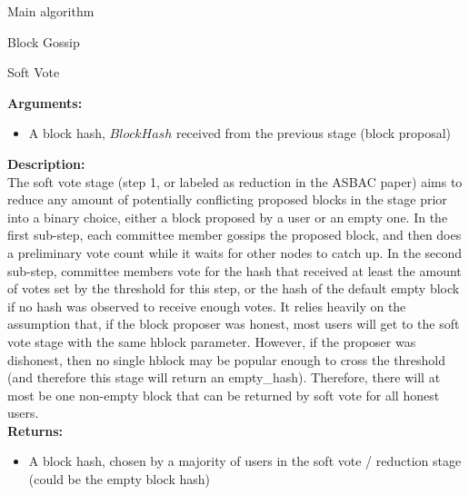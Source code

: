 \documentclass[10pt,a4paper]{article}
\begin{document}
\begin{section}{Main algorithm}
\begin{subsection}{Block Gossip}
\begin{algorithm}[H]
    \caption{\underline{Soft Vote}}
\end{algorithm}


\end{subsection}
\begin{subsection}{Soft Vote}

\noindent \textbf{Arguments:}
\begin{itemize}
    \item A block hash, $BlockHash$ received from the previous stage (block proposal)
  \end{itemize}

\noindent \textbf{Description:}\\
The soft vote stage (step 1, or labeled as reduction in the ASBAC paper) aims to reduce 
any amount of potentially conflicting proposed blocks in the stage prior into a binary 
choice, either a block proposed by a user or an empty one.
In the first sub-step, each committee member gossips the proposed block, and then does a
 preliminary vote count while it waits for other nodes to catch up.
In the second sub-step, committee members vote for the hash that received at least the 
amount of votes set by the threshold for this step, or the hash of the default empty 
block if no hash was observed to receive enough votes.
It relies heavily on the assumption that, if the block proposer was honest, most users 
will get to the soft vote stage with the same hblock parameter.
However, if the proposer was dishonest, then no single hblock may be popular enough to 
cross the threshold (and therefore this stage will return an empty\_hash).
Therefore, there will at most be one non-empty block that can be returned by soft vote 
for all honest users.\\

\noindent \textbf{Returns:}
\begin{itemize}
    \item A block hash, chosen by a majority of users in the soft vote / reduction stage 
    (could be the empty block hash)
  \end{itemize}




\end{subsection}
\end{section}
\end{document}
